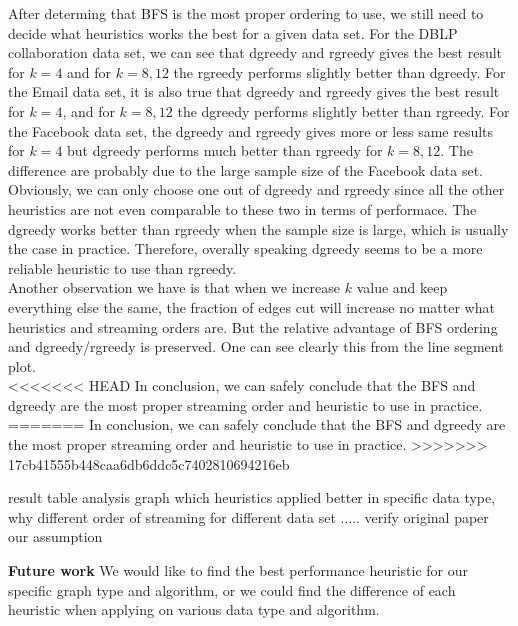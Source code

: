 \documentclass[12pt]{article}
\begin{document}
After determing that BFS is the most proper ordering to use, we still need to decide what heuristics works the best for a given data set. For the DBLP collaboration data set, we can see that dgreedy and rgreedy gives the best result for $k=4$ and for $k=8, 12$ the rgreedy performs slightly better than dgreedy. For the Email data set, it is also true that dgreedy and rgreedy gives the best result for $k=4$, and for $k=8, 12$ the dgreedy performs slightly better than rgreedy. For the Facebook data set, the dgreedy and rgreedy gives more or less same results for $k=4$ but dgreedy performs much better than rgreedy for $k=8, 12$. The difference are probably due to the large sample size of the Facebook data set. Obviously, we can only choose one out of dgreedy and rgreedy since all the other heuristics are not even comparable to these two in terms of performace. The dgreedy works better than rgreedy when the sample size is large, which is usually the case in practice. Therefore, overally speaking dgreedy seems to be a more reliable heuristic to use than rgreedy.\\

Another observation we have is that when we increase $k$ value and keep everything else the same, the fraction of edges cut will increase no matter what heuristics and streaming orders are. But the relative advantage of BFS ordering and dgreedy/rgreedy is preserved. One can see clearly this from the line segment plot. \\

<<<<<<< HEAD
In conclusion, we can safely conclude that the BFS and dgreedy are the most proper streaming order and heuristic to use in practice.
=======
In conclusion, we can safely conclude that the BFS and dgreedy are the most proper streaming order and heuristic to use in practice.
>>>>>>> 17cb41555b448caa6db6ddc5c7402810694216eb

 result table
 analysis graph
 	which heuristics applied better in specific data type, why
	different order of streaming for different data set
	.....
verify original paper
our assumption

\textbf{Future work}
We would like to find the best performance heuristic for our specific graph type and algorithm, or we could find the difference of each heuristic when applying on various data type and algorithm.



\end{document}
